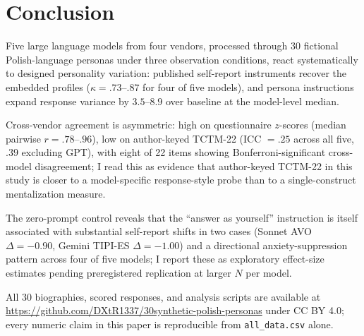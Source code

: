 \documentclass[11pt,a4paper]{article}
\begin{document}
\section{Conclusion}

Five large language models from four vendors, processed through 30 fictional Polish-language personas under three observation conditions, react systematically to designed personality variation: published self-report instruments recover the embedded profiles ($\kappa = .73$--$.87$ for four of five models), and persona instructions expand response variance by $3.5$--$8.9$ over baseline at the model-level median.

Cross-vendor agreement is asymmetric: high on questionnaire $z$-scores (median pairwise $r = .78$--$.96$), low on author-keyed TCTM-22 (ICC $= .25$ across all five, $.39$ excluding GPT), with eight of 22 items showing Bonferroni-significant cross-model disagreement; I read this as evidence that author-keyed TCTM-22 in this study is closer to a model-specific response-style probe than to a single-construct mentalization measure.

The zero-prompt control reveals that the ``answer as yourself'' instruction is itself associated with substantial self-report shifts in two cases (Sonnet AVO $\Delta = -0.90$, Gemini TIPI-ES $\Delta = -1.00$) and a directional anxiety-suppression pattern across four of five models; I report these as exploratory effect-size estimates pending preregistered replication at larger $N$ per model.

All 30 biographies, scored responses, and analysis scripts are available at \url{https://github.com/DXtR1337/30synthetic-polish-personas} under CC BY 4.0; every numeric claim in this paper is reproducible from \texttt{all\_data.csv} alone.
\end{document}
